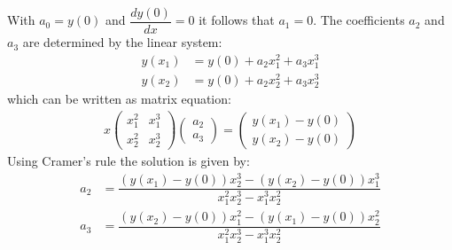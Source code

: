 With $a_0 = y(0)$ and $\dfrac{d y(0)}{d x} = 0$ it follows that $a_1 = 0$.
The coefficients $a_2$ and $a_3$ are determined by the linear system: 
\begin{align}
	y(x_1) &= y(0) + a_2 x_1^2 +  a_3 x_1^3 \\
	y(x_2) &= y(0) + a_2 x_2^2 +  a_3 x_2^3
\end{align}
which can be written as matrix equation:
\begin{align}x
	\begin{pmatrix} x_1^2 & x_1^3 \\
					x_2^2 & x_2^3 
	\end{pmatrix}
	\begin{pmatrix}	a_2 \\ a_3
	\end{pmatrix}
	=
	\begin{pmatrix} y(x_1) - y(0) \\ y(x_2) - y(0)
	\end{pmatrix}
\end{align}
Using Cramer's rule the solution is given by:
\begin{align}
 a_2 &= \dfrac{(y(x_1) - y(0)) x_2^3 - (y(x_2) - y(0)) x_1^3}{x_1^2 x_2^3 - x_1^3 x_2^2} \\
 a_3 &= \dfrac{(y(x_2) - y(0)) x_1^2 - (y(x_1) - y(0)) x_2^2}{x_1^2 x_2^3 - x_1^3 x_2^2}
\end{align}




